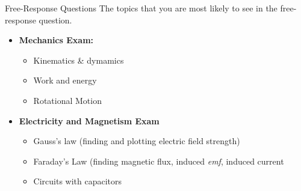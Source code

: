 \documentclass[12pt,aspectratio=169]{beamer}
\begin{document}
%


\begin{frame}{Free-Response Questions}
  The topics that you are most likely to see in the free-response question.
  \begin{itemize}
  \item\textbf{Mechanics Exam:}
    \begin{itemize}
    \item Kinematics \& dymamics
    \item Work and energy
    \item Rotational Motion
    \end{itemize}
  \item\textbf{Electricity and Magnetism Exam}
    \begin{itemize}
    \item Gauss's law (finding and plotting electric field strength)
    \item Faraday's Law (finding magnetic flux, induced \emph{emf}, induced current
    \item Circuits with capacitors
    \end{itemize}
  \end{itemize}
\end{frame}
\end{document}
